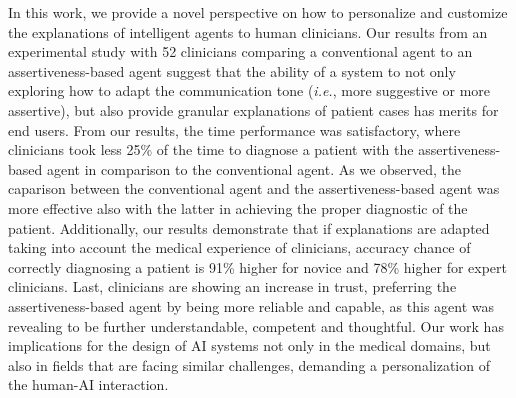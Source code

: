 In this work, we provide a novel perspective on how to personalize and customize the explanations of intelligent agents to human clinicians.
Our results from an experimental study with 52 clinicians comparing a conventional agent to an assertiveness-based agent suggest that the ability of a system to not only exploring how to adapt the communication tone ({\it i.e.}, more suggestive or more assertive), but also provide granular explanations of patient cases has merits for end users.
From our results, the time performance was satisfactory, where clinicians took less 25\% of the time to diagnose a patient with the assertiveness-based agent in comparison to the conventional agent.
As we observed, the caparison between the conventional agent and the assertiveness-based agent was more effective also with the latter in achieving the proper diagnostic of the patient.
Additionally, our results demonstrate that if explanations are adapted taking into account the medical experience of clinicians, accuracy chance of correctly diagnosing a patient is 91\% higher for novice and 78\% higher for expert clinicians.
Last, clinicians are showing an increase in trust, preferring the assertiveness-based agent by being more reliable and capable, as this agent was revealing to be further understandable, competent and thoughtful.
Our work has implications for the design of \ac{AI} systems not only in the medical domains, but also in fields that are facing similar challenges, demanding a personalization of the human-AI interaction.